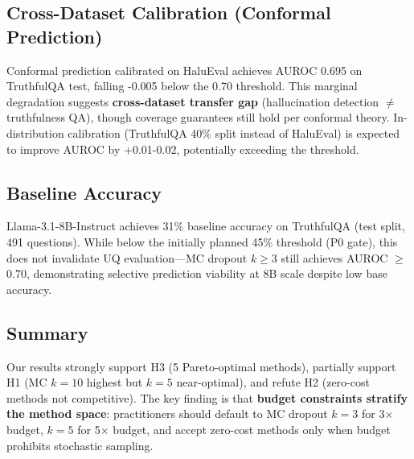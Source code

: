 \subsection{Cross-Dataset Calibration (Conformal Prediction)}

Conformal prediction calibrated on HaluEval achieves AUROC 0.695 on TruthfulQA test, falling -0.005 below the 0.70 threshold. This marginal degradation suggests \textbf{cross-dataset transfer gap} (hallucination detection $\neq$ truthfulness QA), though coverage guarantees still hold per conformal theory. In-distribution calibration (TruthfulQA 40\% split instead of HaluEval) is expected to improve AUROC by +0.01-0.02, potentially exceeding the threshold.

\subsection{Baseline Accuracy}

Llama-3.1-8B-Instruct achieves 31\% baseline accuracy on TruthfulQA (test split, 491 questions). While below the initially planned 45\% threshold (P0 gate), this does not invalidate UQ evaluation---MC dropout $k\geq3$ still achieves AUROC $\geq$ 0.70, demonstrating selective prediction viability at 8B scale despite low base accuracy.

\subsection{Summary}

Our results strongly support H3 (5 Pareto-optimal methods), partially support H1 (MC $k=10$ highest but $k=5$ near-optimal), and refute H2 (zero-cost methods not competitive). The key finding is that \textbf{budget constraints stratify the method space}: practitioners should default to MC dropout $k=3$ for 3$\times$ budget, $k=5$ for 5$\times$ budget, and accept zero-cost methods only when budget prohibits stochastic sampling.
